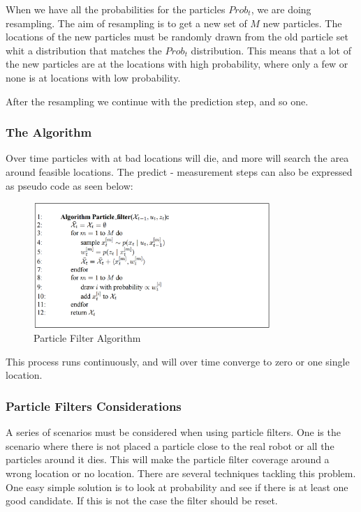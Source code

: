 When we have all the probabilities for the particles $Prob_t$, we are doing resampling. The aim of resampling is to get a new set of $M$ new particles. The locations of the new particles must be randomly drawn from the old particle set whit a distribution that matches the $Prob_t$ distribution. This means that a lot of the new particles are at the locations with high probability, where only a few or none is at locations with low probability.

After the resampling we continue with the prediction step, and so one. 

\subsubsection{The Algorithm}
Over time particles with at bad locations will die, and more will search the area around feasible locations. The predict - measurement steps can also be expressed as pseudo code as seen below: 
\begin{figure}[H]
\centering
\includegraphics[width=0.8\textwidth]{billeder/ParticleFilter.png}
\caption{Particle Filter Algorithm}
\label{fig:ParticleFilter}
\end{figure}
This process runs continuously, and will over time converge to zero or one single location.

\subsubsection{Particle Filters Considerations}
A series of scenarios must be considered when using particle filters. One is the scenario where there is not placed a particle close to the real robot or all the particles around it dies. This will make the particle filter coverage around a wrong location or no location. There are several techniques tackling this problem. One easy simple solution is to look at probability and see if there is at least one good candidate. If this is not the case the filter should be reset. 


